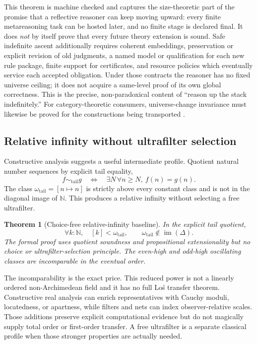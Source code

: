 \documentclass[11pt]{article}
\newtheorem{theorem}{Theorem}
\theoremstyle{definition}
\theoremstyle{remark}
\begin{document}
This theorem is machine checked and captures the size-theoretic part of the
promise that a reflective reasoner can keep moving upward: every finite
metareasoning task can be hosted later, and no finite stage is declared final.
It does \emph{not} by itself prove that every future theory extension is sound.
Safe indefinite ascent additionally requires coherent embeddings, preservation
or explicit revision of old judgments, a named model or qualification for each
new rule package, finite support for certificates, and resource policies which
eventually service each accepted obligation.  Under those contracts the reasoner
has no fixed universe ceiling; it does not acquire a same-level proof of its own
global correctness.  This is the precise, non-paradoxical content of ``reason up
the stack indefinitely.''  For category-theoretic consumers, universe-change
invariance must likewise be proved for the constructions being transported
\cite{ShulmanSetTheory,LowUniverses}.

\subsection{Relative infinity without ultrafilter selection}

Constructive analysis suggests a useful intermediate profile.  Quotient natural
number sequences by explicit tail equality,
\[
  f\sim_{\mathrm{tail}}g
  \quad\Longleftrightarrow\quad
  \exists N\,\forall n\geq N,\ f(n)=g(n).
\]
The class $\omega_{\mathrm{tail}}=[n\mapsto n]$ is strictly above every constant
class and is not in the diagonal image of $\mathbb N$.  This produces a relative
infinity without selecting a free ultrafilter.

\begin{theorem}[Choice-free relative-infinity baseline]
In the explicit tail quotient,
\[
  \forall k:\mathbb N,\quad [k]<\omega_{\mathrm{tail}},
  \qquad
  \omega_{\mathrm{tail}}\notin\operatorname{im}(\Delta).
\]
The formal proof uses quotient soundness and propositional extensionality but no
choice or ultrafilter-selection principle.  The even-high and odd-high
oscillating classes are incomparable in the eventual order.
\end{theorem}

The incomparability is the exact price.  This reduced power is not a linearly
ordered non-Archimedean field and it has no full Lo\'s transfer theorem.
Constructive real analysis can enrich representatives with Cauchy moduli,
locatedness, or apartness, while filters and nets can index observer-relative
scales.  Those additions preserve explicit computational evidence but do not
magically supply total order or first-order transfer.  A free ultrafilter is a
separate classical profile when those stronger properties are actually needed.
\end{document}
